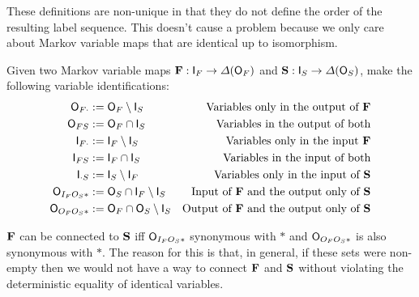 These definitions are non-unique in that they do not define the order of the resulting label sequence. This doesn't cause a problem because we only care about Markov variable maps that are identical up to isomorphism.

Given two Markov variable maps $\mathbf{F}:\mathsf{I}_F\to\Delta(\mathsf{O}_F)$ and $\mathbf{S}:\mathsf{I}_S\to\Delta(\mathsf{O}_S)$, make the following variable identifications:
\begin{align}
	\mathsf{O}_{F\cdot}&:=\mathsf{O}_F\setminus\mathsf{I}_S &\text{Variables only in the output of } \mathbf{F}\\
	\mathsf{O}_{FS}&:=\mathsf{O}_F\cap\mathsf{I}_S &\text{Variables in the output of both}\\
	\mathsf{I}_{F\cdot} &:= \mathsf{I}_F\setminus \mathsf{I}_S &\text{Variables only in the input } \mathbf{F}\\
	\mathsf{I}_{FS}&:= \mathsf{I}_F\cap\mathsf{I}_S &\text{Variables in the input of both}\\
	\mathsf{I}_{\cdot S}&:= \mathsf{I}_S\setminus \mathsf{I}_F &\text{Variables only in the input of }\mathbf{S} \\
	\mathsf{O}_{I_FO_S*}&:=\mathsf{O}_S\cap \mathsf{I}_F\setminus \mathsf{I}_S &\text{Input of }\mathbf{F}\text{ and the output only of }\mathbf{S}\\
	\mathsf{O}_{O_FO_S*} &:= \mathsf{O}_F\cap\mathsf{O}_S\setminus \mathsf{I}_S&\text{Output of }\mathbf{F}\text{ and the output only of }\mathbf{S}\\
\end{align}

$\mathbf{F}$ can be connected to $\mathbf{S}$ iff $\mathsf{O}_{I_FO_S*}$ synonymous with $*$ and $\mathsf{O}_{O_FO_S*}$ is also synonymous with $*$. The reason for this is that, in general, if these sets were non-empty then we would not have a way to connect $\mathbf{F}$ and $\mathbf{S}$ without violating the deterministic equality of identical variables.

